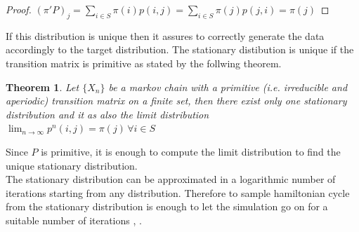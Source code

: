 \documentclass{article}
\newtheorem{theorem}{Theorem}
\begin{document}
\begin{proof}
$ (\pi'P)_j = \sum_{i \in S} \pi(i)p(i,j) = \sum_{i \in S} \pi(j)p(j,i) = \pi(j) $ 
\end{proof}
\noindent If this distribution is unique then it assures to correctly generate the data accordingly to the target distribution. The stationary distibution is unique if the transition matrix is primitive as stated by the follwing theorem.
\begin{theorem}
Let $\{X_n\}$ be a markov chain with a primitive (i.e. irreducible and aperiodic) transition matrix on a finite set, then  there exist only one stationary distribution and it as also the limit distribution $\lim_{n \to \infty} p^n(i,j) = \pi(j)\,  \forall i \in S$
\end{theorem}
\noindent Since $P$ is primitive, it is enough to compute the limit distribution to find the unique stationary distribution. \\
The stationary distribution can be approximated in a logarithmic number of iterations starting from any distribution. Therefore to sample hamiltonian cycle from the stationary distribution is enough to let the simulation go on for a suitable number of iterations \cite{mctheory}, \cite{mcalgorithm}. \\
\end{document}
